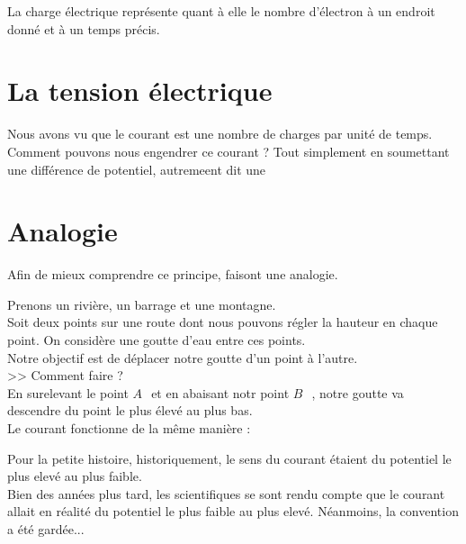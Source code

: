 La charge électrique représente quant à elle le nombre d'électron à un endroit donné et à un temps précis.

\section{La tension électrique}

Nous avons vu que le courant est une nombre de charges par unité de temps. \\
Comment pouvons nous engendrer ce courant ? Tout simplement en soumettant une différence de potentiel, autremeent dit une 

\section{Analogie}
\newcommand{\A}{$A~$~}
\newcommand{\B}{$B~$~}

Afin de mieux comprendre ce principe, faisont une analogie.

Prenons un rivière, un barrage et une montagne.\\

Soit deux points sur une route dont nous pouvons régler la hauteur en chaque point. On considère une goutte d'eau entre ces points. \\
Notre objectif est de déplacer notre goutte d'un point à l'autre.\\

>> Comment faire ?\\

En surelevant le point \A et en abaisant notr point \B, notre goutte va descendre du point le plus élevé au plus bas.\\

Le courant fonctionne de la même manière : \\


Pour la petite histoire, historiquement, le sens du courant étaient du potentiel le plus elevé au plus faible.\\
Bien des années plus tard, les scientifiques se sont rendu compte que le courant allait en réalité du
potentiel le plus faible au plus elevé. Néanmoins, la convention a été gardée...



